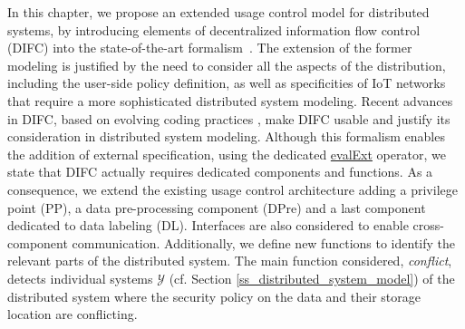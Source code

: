 In this chapter, we propose an extended usage control model for distributed systems, 
by introducing elements of decentralized information flow control (DIFC) into the state-of-the-art formalism~\cite{Kelbert2018}. 
The extension of the former modeling is justified by the need to consider all the aspects of the distribution, including 
the user-side policy definition, as well as specificities of IoT networks that require a more sophisticated 
distributed system modeling. Recent advances in DIFC, based on evolving coding practices \cite{Liu2022}, make DIFC usable 
and justify its consideration in distributed system modeling.
Although this formalism enables the addition of external specification, using the dedicated \underline{evalExt} operator, 
we state that DIFC actually requires dedicated components and functions. As a consequence, we extend the existing usage control architecture 
adding a privilege point (PP), a data pre-processing component (DPre) and a last component dedicated to data labeling (DL). Interfaces 
are also considered to enable cross-component communication. Additionally, 
we define new functions to identify the relevant parts of the distributed system. The main function considered, \emph{conflict},
detects individual systems $\mathcal{Y}$ (cf. Section \ref{ss_distributed_system_model}) of the distributed system where the
security policy on the data and their storage location are conflicting.

